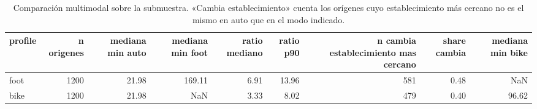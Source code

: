 \begin{table}[htbp]
\caption{Comparación multimodal sobre la submuestra. «Cambia establecimiento» cuenta los orígenes cuyo establecimiento más cercano no es el mismo en auto que en el modo indicado.}
\label{tab:multimodal}
\footnotesize
\begin{tabular}{lrrrrrrrr}
\toprule
profile & n origenes & mediana min auto & mediana min foot & ratio mediano & ratio p90 & n cambia establecimiento mas cercano & share cambia & mediana min bike \\
\midrule
foot & 1200 & 21.98 & 169.11 & 6.91 & 13.96 & 581 & 0.48 & NaN \\
bike & 1200 & 21.98 & NaN & 3.33 & 8.02 & 479 & 0.40 & 96.62 \\
\bottomrule
\end{tabular}
\end{table}
